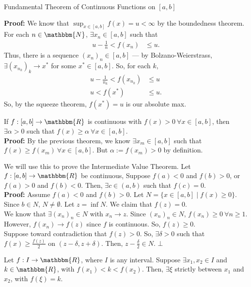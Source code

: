 \documentclass[10pt]{extarticle}
\newcommand{\N}{\mathbbm{N}}
\newcommand{\R}{\mathbbm{R}}
\begin{document}
\begin{problem}{Fundamental Theorem of Continuous Functions on $[a,b]$}
\begin{description}
        \textbf{Proof:} We know that $\sup_{x\in[a,b]}f(x) = u < \infty$ by the boundedness theorem. For each $n\in \N$, $\exists x_n\in [a,b]$ such that
        \begin{align*}
          u-\frac{1}{n} < f(x_n) &\leq u.
        \end{align*}
        Thus, there is a sequence $(x_n)_n \in [a,b]$ --- by Bolzano-Weierstrass, $\exists (x_{n_k})_k \rightarrow x^{\ast}$ for some $x^{\ast}\in [a,b]$. So, for each $k$,
        \begin{align*}
          u-\frac{1}{n_k} < f(x_{n_k}) &\leq u\\
          u < f(x^{\ast}) &\leq u. \tag*{since $f$ is continuous}
        \end{align*}
        So, by the squeeze theorem, $f(x^{\ast}) = u$ is our absolute max.
      \item[Corollary to the Extreme Value Theorem:] If $f: [a,b]\rightarrow \R$ is continuous with $f(x) > 0~\forall x\in [a,b]$, then $\exists \alpha > 0$ such that $f(x) \geq \alpha~\forall x\in [a,b]$.\\

        \textbf{Proof:} By the previous theorem, we know $\exists x_m\in [a,b]$ such that $f(x) \geq f(x_m)~\forall x\in [a,b]$. But $\alpha:= f(x_m) > 0$ by definition.
      \item[Location of Roots:] We will use this to prove the Intermediate Value Theorem. Let $f: [a,b] \rightarrow \R$ be continuous, Suppose $f(a) < 0$ and $f(b) > 0$, or $f(a) > 0$ and $f(b) < 0$. Then, $\exists c\in (a,b)$ such that $f(c) = 0$.\\

        \textbf{Proof:} Assume $f(a) < 0$ and $f(b) > 0$. Let $N = \{x\in [a,b] \mid f(x) \geq 0\}$. Since $b\in N$, $N\neq \emptyset$. Let $z = \inf{N}$. We claim that $f(z) = 0$.\\

        We know that $\exists (x_n)_n \in N$ with $x_n \rightarrow z$. Since $(x_n)_n \in N$, $f(x_n) \geq 0~\forall n\geq 1$. However, $f(x_n) \rightarrow f(z)$ since $f$ is continuous. So, $f(z) \geq 0$.\\

        Suppose toward contradiction that $f(z) > 0$. So, $\exists \delta > 0$ such that $f(x) \geq \frac{f(z)}{2}$ on $(z-\delta,z+\delta)$. Then, $z-\frac{\delta}{2}\in N$. $\bot$
      \item[Intermediate Value Theorem (IVT):] Let $f: I \rightarrow \R$, where $I$ is any interval. Suppose $\exists x_1,x_2\in I$ and $k\in \R$, with $f(x_1) < k < f(x_2)$. Then, $\exists \xi$ strictly between $x_1$ and $x_2$, with $f(\xi) = k$.\\


\end{description}
\end{problem}
\end{document}
